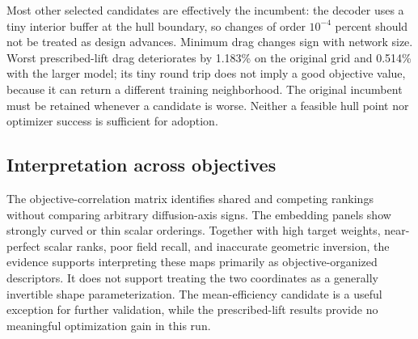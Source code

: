Most other selected candidates are effectively the incumbent: the decoder uses a tiny interior buffer at the hull boundary, so changes of order $10^{-4}$ percent should not be treated as design advances. Minimum drag changes sign with network size. Worst prescribed-lift drag deteriorates by 1.183\% on the original grid and 0.514\% with the larger model; its tiny round trip does not imply a good objective value, because it can return a different training neighborhood. The original incumbent must be retained whenever a candidate is worse. Neither a feasible hull point nor optimizer success is sufficient for adoption.

\subsection{Interpretation across objectives}

The objective-correlation matrix identifies shared and competing rankings without comparing arbitrary diffusion-axis signs. The embedding panels show strongly curved or thin scalar orderings. Together with high target weights, near-perfect scalar ranks, poor field recall, and inaccurate geometric inversion, the evidence supports interpreting these maps primarily as objective-organized descriptors. It does not support treating the two coordinates as a generally invertible shape parameterization. The mean-efficiency candidate is a useful exception for further validation, while the prescribed-lift results provide no meaningful optimization gain in this run.